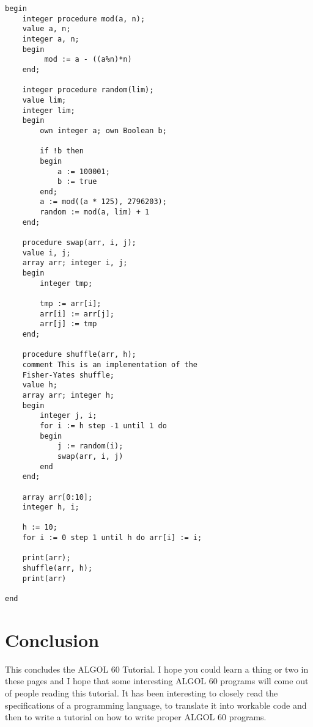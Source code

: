 \documentclass{article}
\begin{document}
\begin{lstlisting}[language={[60]algol}]
begin
    integer procedure mod(a, n);
    value a, n;
    integer a, n;
    begin
         mod := a - ((a%n)*n)
    end;
 
    integer procedure random(lim);
    value lim;
    integer lim;
    begin
        own integer a; own Boolean b;
        
        if !b then
        begin
            a := 100001;
            b := true
        end;
        a := mod((a * 125), 2796203);
        random := mod(a, lim) + 1
    end;

    procedure swap(arr, i, j);
    value i, j;
    array arr; integer i, j;
    begin
        integer tmp;

        tmp := arr[i];
        arr[i] := arr[j];
        arr[j] := tmp
    end;

    procedure shuffle(arr, h);
    comment This is an implementation of the 
    Fisher-Yates shuffle;
    value h;
    array arr; integer h;
    begin
        integer j, i;
        for i := h step -1 until 1 do
        begin
            j := random(i);
            swap(arr, i, j)
        end
    end;

    array arr[0:10];
    integer h, i;

    h := 10;
    for i := 0 step 1 until h do arr[i] := i;

    print(arr);
    shuffle(arr, h);
    print(arr)

end
\end{lstlisting}

\section{Conclusion}
This concludes the ALGOL 60 Tutorial. I hope you could learn a thing or two in these pages and I hope that some interesting ALGOL 60 programs will come out of people reading this tutorial. It has been interesting to closely read the specifications of a programming language, to translate it into workable code and then to write a tutorial on how to write proper ALGOL 60 programs.
\end{document}
